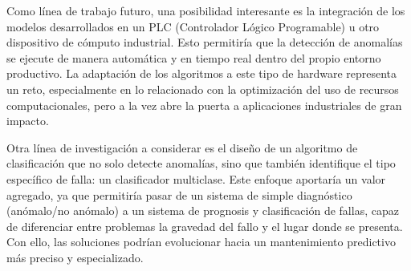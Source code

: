 \documentclass[11pt,a4paper,spanish]{book}
\numberwithin{equation}{chapter}
\numberwithin{figure}{chapter}
\begin{document}
Como línea de trabajo futuro, una posibilidad interesante es la integración de los 
modelos desarrollados en un PLC (Controlador Lógico Programable) u otro dispositivo
de cómputo industrial. Esto permitiría que la detección de anomalías se ejecute de 
manera automática y en tiempo real dentro del propio entorno productivo. La adaptación
de los algoritmos a este tipo de hardware representa un reto, especialmente en lo 
relacionado con la optimización del uso de recursos computacionales, pero a la vez abre
la puerta a aplicaciones industriales de gran impacto.


Otra línea de investigación a considerar es el diseño de un algoritmo de clasificación
que no solo detecte anomalías, sino que también identifique el tipo específico de falla:
un clasificador multiclase.  Este enfoque aportaría un valor agregado, ya que permitiría
pasar de un sistema de simple diagnóstico (anómalo/no anómalo) a un sistema de prognosis
y clasificación de fallas, capaz de diferenciar entre problemas la gravedad del fallo y 
el lugar donde se presenta. Con ello, las soluciones podrían evolucionar hacia un 
mantenimiento predictivo más preciso y especializado.









\end{document}
